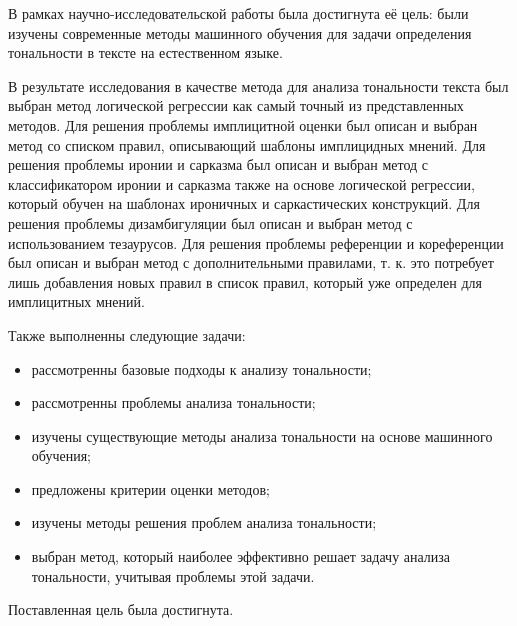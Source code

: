 \documentclass[a4paper,14pt, unknownkeysallowed]{extreport}
\begin{document}
В рамках научно-исследовательской работы была достигнута её цель: были изучены современные методы машинного обучения для задачи определения тональности в тексте на естественном языке. 

В результате исследования в качестве метода для анализа тональности текста был выбран метод логической регрессии как самый точный из представленных методов. Для решения проблемы имплицитной оценки был описан и выбран метод со списком правил, описывающий шаблоны имплицидных мнений. Для решения проблемы иронии и сарказма был описан и выбран метод с классификатором иронии и сарказма также на основе логической регрессии, который обучен на шаблонах ироничных и саркастических конструкций. Для решения проблемы дизамбигуляции был описан и выбран метод с использованием тезаурусов. Для решения проблемы референции и кореференции был описан и выбран метод с дополнительными правилами, т. к. это потребует лишь добавления новых правил в список правил, который уже определен для имплицитных мнений.

Также выполненны следующие задачи: 
\begin{itemize}
	\item рассмотренны базовые подходы к анализу тональности;
	\item рассмотренны проблемы анализа тональности;
	\item изучены существующие методы анализа тональности на основе машинного обучения;
	\item предложены критерии оценки методов;
	\item изучены методы решения проблем анализа тональности;
	\item выбран метод, который наиболее эффективно решает задачу анализа тональности, учитывая проблемы этой задачи.
\end{itemize}

Поставленная цель была достигнута.

\newpage
{}
\renewcommand\bibname{Список литературы} %
\end{document}

